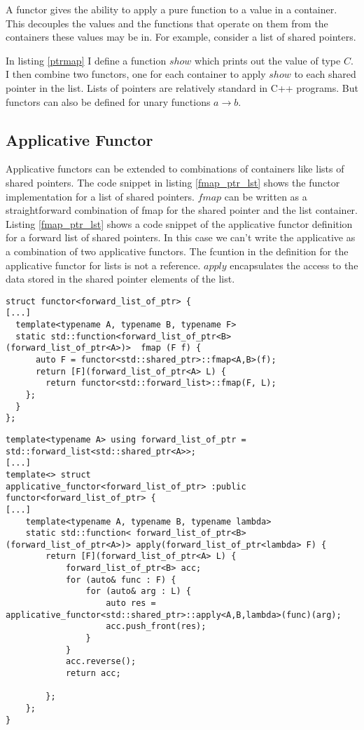 \documentclass[12pt,fleqn]{article}
\begin{document}
A functor gives the ability to apply a pure function to a value in a container.
This decouples the values and the functions that operate on them from the containers these values may be in.
For example, consider a list of shared pointers.

In listing \ref{ptrmap} I define a function $show$ which prints out the value of type $C$. I then combine two functors, one for each container to apply $show$ 
to each shared pointer in the list.
Lists of pointers are relatively standard in C++ programs. But functors can also be defined for unary functions $a \rightarrow b$.

%
%
%
\subsection{Applicative Functor}
%
%

Applicative functors can be extended to combinations of containers like lists of shared pointers.
The code snippet in listing \ref{fmap_ptr_lst} shows the functor implementation for a list of shared pointers.
$fmap$ can be written as a straightforward combination of fmap for the shared pointer and the list container.
Listing \ref{fmap_ptr_lst} shows a code snippet of the applicative functor definition for a forward list of shared pointers.
In this case we can't write the applicative as a combination of two applicative functors. 
The fcuntion in the definition for the applicative functor for lists is not a reference.
$apply$ encapsulates the access to the data stored in the shared pointer elements of the list.

\begin{lstlisting}[caption=fmap implementation for a list of shared pointers, label=fmap_ptr_lst]
struct functor<forward_list_of_ptr> {
[...]
  template<typename A, typename B, typename F>
  static std::function<forward_list_of_ptr<B> (forward_list_of_ptr<A>)>  fmap (F f) {
	  auto F = functor<std::shared_ptr>::fmap<A,B>(f);
	  return [F](forward_list_of_ptr<A> L) {
		return functor<std::forward_list>::fmap(F, L);
    };
  }
};
\end{lstlisting}
\begin{lstlisting}[caption=applicative functor for a list of shared pointers, label=apf_ptr_list]
template<typename A> using forward_list_of_ptr = std::forward_list<std::shared_ptr<A>>;
[...]
template<> struct 
applicative_functor<forward_list_of_ptr> :public functor<forward_list_of_ptr> {
[...]
    template<typename A, typename B, typename lambda>
    static std::function< forward_list_of_ptr<B> (forward_list_of_ptr<A>)> apply(forward_list_of_ptr<lambda> F) {
		return [F](forward_list_of_ptr<A> L) {
			forward_list_of_ptr<B> acc;
			for (auto& func : F) {
				for (auto& arg : L) {
					auto res = applicative_functor<std::shared_ptr>::apply<A,B,lambda>(func)(arg);
					acc.push_front(res);
				}
			} 
			acc.reverse();
			return acc;
			
		};
	};
}	
\end{lstlisting}
\end{document}
